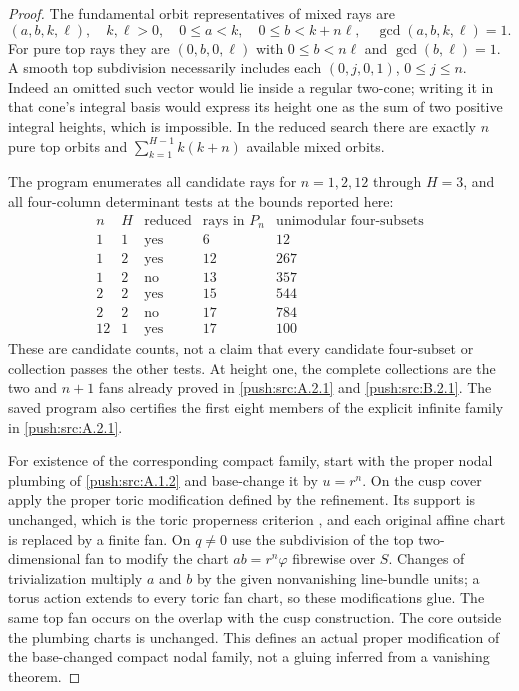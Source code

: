 \begin{proof}
The fundamental orbit representatives of mixed rays are
\[
 (a,b,k,\ell),\quad k,\ell>0,
 \quad0\leq a<k,\quad0\leq b<k+n\ell,
 \quad\gcd(a,b,k,\ell)=1.
 \tag{A.24c}
\]
For pure top rays they are $(0,b,0,\ell)$ with
$0\leq b<n\ell$ and $\gcd(b,\ell)=1$. A smooth top
subdivision necessarily includes each $(0,j,0,1)$,
$0\leq j\leq n$. Indeed an omitted such vector would lie
inside a regular two-cone; writing it in that cone's integral
basis would express its height one as the sum of two
positive integral heights, which is impossible.
In the reduced search there are exactly $n$ pure top orbits
and $\sum_{k=1}^{H-1}k(k+n)$ available mixed orbits.

The program  enumerates
all candidate rays for $n=1,2,12$ through $H=3$, and all
four-column determinant tests at the bounds reported here:
\[
\begin{array}{c|c|c|r|r}
n&H&\text{reduced}&\text{rays in }P_n&
       \text{unimodular four-subsets}\\\hline
1&1&\text{yes}&6&12\\
1&2&\text{yes}&12&267\\
1&2&\text{no}&13&357\\
2&2&\text{yes}&15&544\\
2&2&\text{no}&17&784\\
12&1&\text{yes}&17&100
\end{array}
\]
These are candidate counts, not a claim that every candidate
four-subset or collection passes the other tests. At height
one, the complete collections are the two and $n+1$ fans
already proved in \ref{push:src:A.2.1} and \ref{push:src:B.2.1}. The saved program also
certifies the first eight members of the explicit infinite
family in \ref{push:src:A.2.1}.

For existence of the corresponding compact family, start
with the proper nodal plumbing of \ref{push:src:A.1.2} and base-change it
by $u=r^n$. On the cusp cover apply the proper toric
modification defined by the refinement. Its support is
unchanged, which is the toric properness criterion
\cite[Section 2, p.6]{DMM16}, and each
original affine chart is replaced by a finite fan. On
$q\ne0$ use the subdivision of the top two-dimensional fan
to modify the chart $ab=r^n\varphi$ fibrewise over $S$.
Changes of trivialization multiply $a$ and $b$ by the given
nonvanishing line-bundle units; a torus action extends to
every toric fan chart, so these modifications glue. The same
top fan occurs on the overlap with the cusp construction.
The core outside the plumbing charts is unchanged. This defines
an actual proper modification of the base-changed compact
nodal family, not a gluing inferred from a vanishing theorem.


\end{proof}
